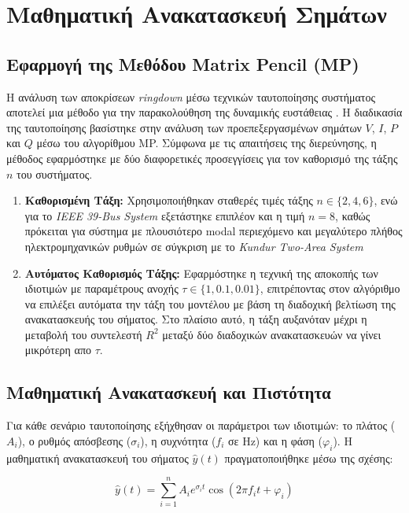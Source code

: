 \documentclass[conference]{IEEEtran}
\begin{document}
\section{Μαθηματική Ανακατασκευή Σημάτων}
\subsection{Εφαρμογή της Μεθόδου Matrix Pencil (MP)}
Η ανάλυση των αποκρίσεων \textit{ringdown} μέσω τεχνικών ταυτοποίησης συστήματος αποτελεί μια μέθοδο για την παρακολούθηση της δυναμικής ευστάθειας \cite{modal2018}. Η διαδικασία της ταυτοποίησης βασίστηκε στην ανάλυση των προεπεξεργασμένων σημάτων $V$, $I$, $P$ και $Q$ μέσω του αλγορίθμου MP. Σύμφωνα με τις απαιτήσεις της διερεύνησης, η μέθοδος εφαρμόστηκε με δύο διαφορετικές προσεγγίσεις για τον καθορισμό της τάξης $n$ του συστήματος. 

\begin{enumerate}
    \item \textbf{Καθορισμένη Τάξη:} Χρησιμοποιήθηκαν σταθερές τιμές τάξης $n \in \{2, 4, 6\}$, ενώ για το \textit{IEEE 39-Bus System} εξετάστηκε επιπλέον και η τιμή $n=8$, καθώς πρόκειται για σύστημα με πλουσιότερο modal περιεχόμενο και μεγαλύτερο πλήθος ηλεκτρομηχανικών ρυθμών σε σύγκριση με το \textit{Kundur Two-Area System}~\cite{sarkar2024drga}
    \item \textbf{Αυτόματος Καθορισμός Τάξης:} Εφαρμόστηκε η τεχνική της αποκοπής των ιδιοτιμών με παραμέτρους ανοχής $\tau \in \{1, 0.1, 0.01\}$, ε\-πι\-τρέ\-πο\-ντας στον αλγόριθμο να επιλέξει αυτόματα την τάξη του μοντέλου με βάση τη διαδοχική βελτίωση της ανακατασκευής του σήματος. Στο πλαίσιο αυτό, η τάξη αυξανόταν μέχρι η μεταβολή του συντελεστή  $R^2$  μεταξύ δύο διαδοχικών ανακατασκευών να γίνει μικρότερη απο $\tau$.
\end{enumerate}

\subsection{Μαθηματική Ανακατασκευή και Πιστότητα}
Για κάθε σενάριο ταυτοποίησης εξήχθησαν οι παράμετροι των ιδιοτιμών: το πλάτος ($A_{i}$), ο ρυθμός απόσβεσης ($\sigma_{i}$), η συχνότητα ($f_{i}$ σε Hz) και η φάση ($\varphi_{i}$). Η μαθηματική ανακατασκευή του σήματος $\hat{y}(t)$ πραγματοποιήθηκε μέσω της σχέσης:

\begin{equation}
\hat{y}(t)=\sum_{i=1}^{n}A_{i}e^{\sigma_{i}t}\cos(2\pi f_{i}t+\varphi_{i})
\label{eq:reconstruction}
\end{equation}
\end{document}
